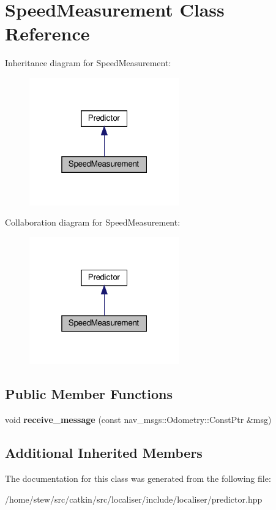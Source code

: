 \hypertarget{classSpeedMeasurement}{}\section{Speed\+Measurement Class Reference}
\label{classSpeedMeasurement}


Inheritance diagram for Speed\+Measurement\+:
\nopagebreak
\begin{figure}[H]
\begin{center}
\leavevmode
\includegraphics[width=184pt]{classSpeedMeasurement__inherit__graph}
\end{center}
\end{figure}


Collaboration diagram for Speed\+Measurement\+:
\nopagebreak
\begin{figure}[H]
\begin{center}
\leavevmode
\includegraphics[width=184pt]{classSpeedMeasurement__coll__graph}
\end{center}
\end{figure}
\subsection*{Public Member Functions}
\begin{DoxyCompactItemize}
\item 
\mbox{\label{classSpeedMeasurement_adb209fa0d3651ff9e021476367322bc7}} 
void {\bfseries receive\+\_\+message} (const nav\+\_\+msgs\+::\+Odometry\+::\+Const\+Ptr \&msg)
\end{DoxyCompactItemize}
\subsection*{Additional Inherited Members}


The documentation for this class was generated from the following file\+:\begin{DoxyCompactItemize}
\item 
/home/stew/src/catkin/src/localiser/include/localiser/predictor.\+hpp\end{DoxyCompactItemize}
